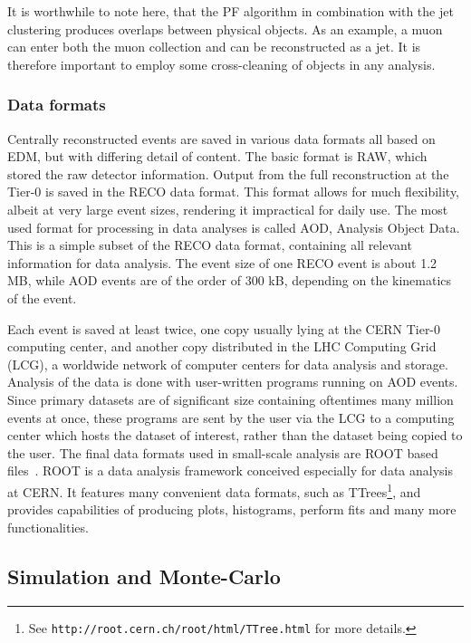 It is worthwhile to note here, that the PF algorithm in combination with the jet clustering produces overlaps between physical objects. As an example, a muon can enter both the muon
collection and can be reconstructed as a jet. It is therefore important to employ some cross-cleaning of objects in any analysis.

\subsubsection*{Data formats}
Centrally reconstructed events are saved in various data formats all based on EDM, but with differing detail of content. The basic format is RAW, which stored the raw detector information. 
Output from the full reconstruction at the Tier-0 is saved in the RECO data format. This format allows for much flexibility, albeit at very large event sizes, rendering it impractical 
for daily use. The most used format for processing in data analyses is called AOD, Analysis Object Data. This is a simple subset of the RECO data format, containing all relevant information 
for data analysis. The event size of one RECO event is about 1.2 MB, while AOD events are of the order of 300 kB, depending on the kinematics of the event.

Each event is saved at least twice, one copy usually lying at the CERN Tier-0 computing center, and another copy distributed in the LHC Computing Grid (LCG), a worldwide network of computer 
centers for data analysis and storage. Analysis of the data is done with user-written programs running on AOD events. Since primary datasets are of significant size containing oftentimes
many million events at once, these programs are sent by the user via the LCG to a computing center which hosts the dataset of interest, rather than the dataset being copied to the user. The final
data formats used in small-scale analysis are ROOT based files~\cite{root}. ROOT is a data analysis framework conceived especially for data analysis at CERN. It features many convenient 
data formats, such as TTrees\footnote{See \texttt{http://root.cern.ch/root/html/TTree.html} for more details.}, and provides capabilities of producing plots, histograms, perform fits and many 
more functionalities.


\subsection{Simulation and Monte-Carlo}
\label{sub:cms_mc}

